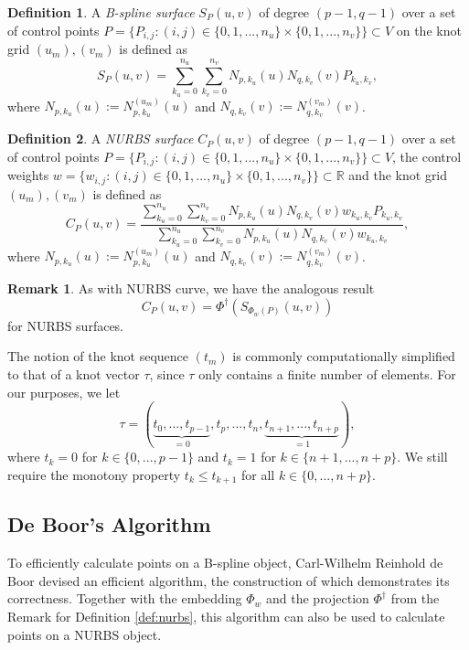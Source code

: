 \documentclass[a4paper, 11pt]{report}
\theoremstyle{definition}
\newtheorem{definition}{Definition}[section]
\newtheorem*{remark}{Remark}
\renewcommand{\emph}[1]{\textit{#1}}
\begin{document}
\begin{definition}
	A \emph{B-spline surface} $S_P(u,v)$ of degree $(p-1, q-1)$ over a set of control points $P = \{P_{i,j} : (i,j) \in \{0,1,...,n_u\} \times \{0,1,...,n_v\}\} \subset V$ on the knot grid $(u_m), (v_m)$ is defined as
		$$ S_P(u,v) = \sum_{k_u=0}^{n_u} \sum_{k_v=0}^{n_v} N_{p,k_u}(u) N_{q,k_v}(v) P_{k_u,k_v},$$
	where $N_{p,k_u}(u) := N_{p,k_u}^{(u_m)}(u)$ and $N_{q,k_v}(v) := N_{q,k_v}^{(v_m)}(v)$.
\end{definition}

\begin{definition}
	A \emph{NURBS surface} $C_P(u,v)$ of degree $(p-1, q-1)$ over a set of control points $P = \{P_{i,j} : (i,j) \in \{0,1,...,n_u\} \times \{0,1,...,n_v\}\} \subset V$, the control weights $w = \{w_{i,j} : (i,j) \in \{0,1,...,n_u\} \times \{0,1,...,n_v\}\} \subset \mathbb{R}$ and the knot grid $(u_m), (v_m)$ is defined as
		$$ C_P(u,v) = \frac {\sum_{k_u=0}^{n_u} \sum_{k_v=0}^{n_v} N_{p,k_u}(u) N_{q,k_v}(v) w_{k_u, k_v} P_{k_u,k_v}}{\sum_{k_u=0}^{n_u} \sum_{k_v=0}^{n_v} N_{p,k_u}(u) N_{q,k_v}(v) w_{k_u, k_v}},$$
	where $N_{p,k_u}(u) := N_{p,k_u}^{(u_m)}(u)$ and $N_{q,k_v}(v) := N_{q,k_v}^{(v_m)}(v)$.
\end{definition}

\begin{remark}
	As with NURBS curve, we have the analogous result
		$$ C_P(u,v) = \Phi^\dagger ({S_{\Phi_w(P)}(u,v)}) $$
	for NURBS surfaces.
\end{remark}

The notion of the knot sequence $(t_m)$ is commonly computationally simplified to that of a knot vector $\tau$, since $\tau$ only contains a finite number of elements. For our purposes, we let
	$$\tau = (\underbrace {t_0, ..., t_{p-1}}_{= 0}, t_p, ..., t_n, \underbrace{t_{n+1}, ..., t_{n+p}}_{= 1}),$$
where $t_k = 0$ for $k \in \{0,...,p-1\}$ and $t_k = 1$ for $k \in \{n+1, ..., n+p\}$. We still require the monotony property $t_k \leq t_{k+1}$ for all $k \in \{0, ..., n+p\}$.

\subsection{De Boor's Algorithm}
To efficiently calculate points on a B-spline object, Carl-Wilhelm Reinhold de Boor devised an efficient algorithm, the construction of which demonstrates its correctness. Together with the embedding $\Phi_w$ and the projection $\Phi^\dagger$ from the Remark for Definition \ref{def:nurbs}, this algorithm can also be used to calculate points on a NURBS object.
\end{document}

